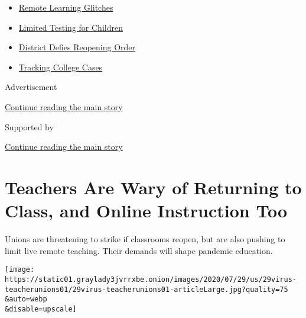 \begin{itemize}
\tightlist
\item
  \href{https://www.nytimes3xbfgragh.onion/2020/09/08/us/school-districts-cyberattacks-glitches.html?name=styln-coronavirus-schools-reopening\&region=TOP_BANNER\&block=storyline_menu_recirc\&action=click\&pgtype=Article\&impression_id=38515391-f4c5-11ea-96c6-737460281ea1\&variant=undefined}{Remote
  Learning Glitches}
\item
  \href{https://www.nytimes3xbfgragh.onion/2020/09/08/upshot/children-testing-shortfalls-virus.html?name=styln-coronavirus-schools-reopening\&region=TOP_BANNER\&block=storyline_menu_recirc\&action=click\&pgtype=Article\&impression_id=38517aa0-f4c5-11ea-96c6-737460281ea1\&variant=undefined}{Limited
  Testing for Children}
\item
  \href{https://www.nytimes3xbfgragh.onion/2020/09/10/us/des-moines-school-opening-coronavirus.html?name=styln-coronavirus-schools-reopening\&region=TOP_BANNER\&block=storyline_menu_recirc\&action=click\&pgtype=Article\&impression_id=38517aa1-f4c5-11ea-96c6-737460281ea1\&variant=undefined}{District
  Defies Reopening Order}
\item
  \href{https://www.nytimes3xbfgragh.onion/interactive/2020/us/covid-college-cases-tracker.html?name=styln-coronavirus-schools-reopening\&region=TOP_BANNER\&block=storyline_menu_recirc\&action=click\&pgtype=Article\&impression_id=38517aa2-f4c5-11ea-96c6-737460281ea1\&variant=undefined}{Tracking
  College Cases}
\end{itemize}

Advertisement

\protect\hyperlink{after-top}{Continue reading the main story}

Supported by

\protect\hyperlink{after-sponsor}{Continue reading the main story}

\hypertarget{teachers-are-wary-of-returning-to-class-and-online-instruction-too}{%
\section{Teachers Are Wary of Returning to Class, and Online Instruction
Too}\label{teachers-are-wary-of-returning-to-class-and-online-instruction-too}}

Unions are threatening to strike if classrooms reopen, but are also
pushing to limit live remote teaching. Their demands will shape pandemic
education.

\texttt{[image: https://static01.graylady3jvrrxbe.onion/images/2020/07/29/us/29virus-teacherunions01/29virus-teacherunions01-articleLarge.jpg?quality=75\\\&auto=webp\\\&disable=upscale]}

